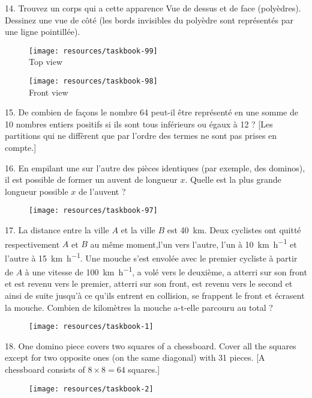 \begin{problem}{14.}
Trouvez un corps qui a cette apparence
Vue de dessus et de face (polyèdres). Dessinez une vue
de côté (les bords invisibles du polyèdre sont représentés
par une ligne pointillée).

\begin{figure}
	\footnotesize
	\null\hfill
	\parbox{0.2\linewidth}{\centering\texttt{[image: resources/taskbook-99]}\\Top view}
	\hfill
	\parbox{0.2\linewidth}{\centering\texttt{[image: resources/taskbook-98]}\\Front view}
	\hfill\null
\end{figure}
\end{problem}

\begin{problem}{15.}
De combien de façons le nombre 64 peut-il être représenté en une somme de 10 nombres entiers positifs si ils sont tous inférieurs ou égaux à 12 ?
[Les partitions qui ne diffèrent que par l'ordre des termes ne sont pas prises en compte.]
\end{problem}

\begin{problem}{16.}
En empilant une sur l'autre des pièces identiques (par exemple, des dominos), il est possible de former un auvent de longueur $x$. Quelle est la plus grande longueur possible $x$ de l'auvent ?
\begin{figure}
	\texttt{[image: resources/taskbook-97]}
\end{figure}
\end{problem}

\begin{problem}{17.}
La distance entre la ville $A$ et la ville $B$ est \SI{40}{\km}. Deux cyclistes ont quitté respectivement $A$ et $B$ au même moment,l'un vers l'autre, l'un à \SI{10}{\km\per\hour} et l'autre à \SI{15}{\km\per\hour}. Une mouche s'est envolée avec le premier cycliste à partir de $A$ à une vitesse de \SI{100}{\km\per\hour}, a volé vers le deuxième, a atterri sur son front et est revenu vers le premier, atterri sur son front, est revenu vers le second et ainsi de suite jusqu'à ce qu'ils entrent en collision, se frappent le front et écrasent la mouche. Combien de kilomètres la mouche a-t-elle parcouru au total ?
\begin{figure}
	\texttt{[image: resources/taskbook-1]}
\end{figure}
\end{problem}

\begin{problem}{18.}
One domino piece covers two squares of a chessboard.
Cover all the squares
except for two opposite ones (on the same diagonal) with 31 pieces. [A chessboard consists of $8 \times 8 = 64$ squares.]
\begin{figure}
	\texttt{[image: resources/taskbook-2]}
\end{figure}
\end{problem}

